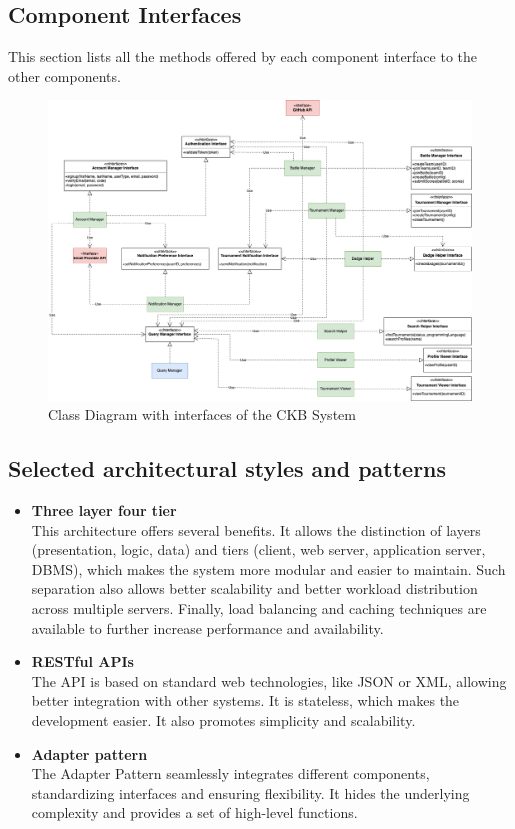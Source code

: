 \newpage
\subsection{Component Interfaces}
This section lists all the methods offered by each component interface to the other components.
\begin{figure}[h]
    \centering
    \includegraphics[width=1\linewidth]{src/Class Diagram with interfaces of the CKB System.png}
    \caption{Class Diagram with interfaces of the CKB System}
    \label{fig:Class Diagram with interfaces of the CKB System}
\end{figure}
\subsection{Selected architectural styles and patterns}
\begin{itemize}
    \item \textbf{Three layer four tier}\\
    This architecture offers several benefits. It allows the distinction of layers (presentation, logic, data) and tiers (client, web server, application server, DBMS), which makes the system more modular and easier to maintain. Such separation also allows better scalability and better workload distribution across multiple servers. Finally, load balancing and caching techniques are available to further increase performance and availability.

    \item \textbf{RESTful APIs}\\
    The API is based on standard web technologies, like JSON or XML, allowing better integration with other systems. It is stateless, which makes the development easier. It also promotes simplicity and scalability.\\
    \item \textbf{Adapter pattern}\\
    The Adapter Pattern seamlessly integrates different components, standardizing interfaces and ensuring flexibility. It hides the underlying complexity and provides a set of high-level functions. 
\end{itemize}

